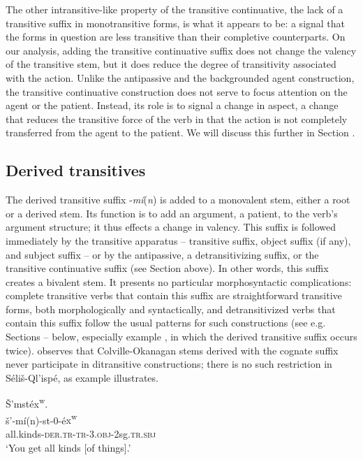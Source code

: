 \documentclass[output=paper,colorlinks,citecolor=brown]{langscibook}
\begin{document}
The other intransitive-like property of the transitive continuative,
the lack of a transitive suffix in monotransitive forms, is what it
appears to be: a signal that the forms in question are less transitive
than their completive counterparts.  On our analysis, adding the
transitive continuative suffix does not change the valency of the
transitive stem, but it does reduce the degree of transitivity
associated with the action.  Unlike the antipassive and the
backgrounded agent construction, the transitive continuative
construction does not serve to focus attention on the agent or the
patient.  Instead, its role is to signal a change in aspect, a change
that reduces the transitive force of the verb in that the action is
not completely transferred from the agent to the patient.  We will
discuss this further in Section .

\subsection{Derived transitives}  %
\label{thomason_section_2.7}

The derived transitive suffix -\emph{m\'i}(\emph{n}) is added to a
monovalent stem, either a root or a derived stem.  Its function is to
add an argument, a patient, to the verb's argument structure; it thus
effects a change in valency.  This suffix is followed immediately by
the transitive apparatus -- transitive suffix, object suffix (if
any), and subject suffix -- or by the antipassive, a detransitivizing
suffix, or the transitive continuative suffix (see Section  above).
In other words, this suffix creates a bivalent stem.  It presents no
particular morphosyntactic complications: complete transitive verbs
that contain this suffix are straightforward transitive forms, both
morphologically and syntactically, and detransitivized verbs that
contain this suffix follow the usual patterns for such constructions
(see e.g. Sections -- below, especially example , in which the derived
transitive suffix occurs twice).  \citet[430]{Mattina:1982} observes that
Colville-Okanagan stems derived with the cognate suffix never
participate in ditransitive constructions; there is no such
restriction in S\'eli\v{s}-Ql'isp\'e, as example  illustrates.

\ea
\label{ex-thomason-30}
\v{S}{\textcrlambda}'mst\'ex\textsuperscript w. \\
\gll \v{s}{\textcrlambda}'-m\'i(n)-st-0-\'e{x\textsuperscript w} \\
all.kinds-\textsc{der.tr}-\textsc{tr}-3.\textsc{obj}-2sg.\textsc{tr.sbj} \\
\glt `You get all kinds [of things].'
\z
\end{document}
